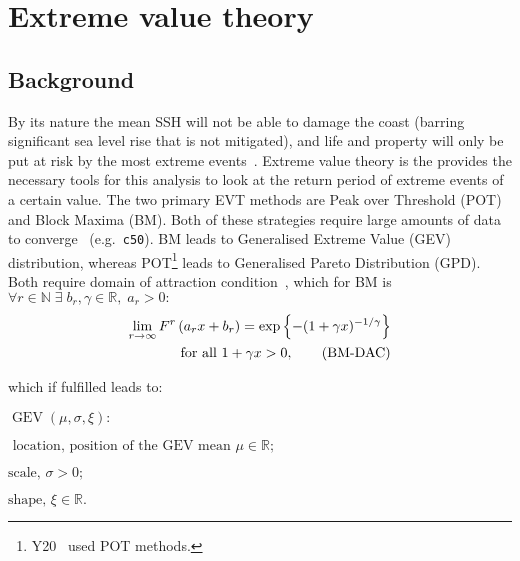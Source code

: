 \section{Extreme value theory}
\label{sec:evt}
\subsection{Background}
By its nature the mean SSH will
not be able to damage the coast
(barring significant sea level rise that is not mitigated),
and life and property will only be put
at risk by the most extreme events~\cite{taleb2019statistical}.
Extreme value theory is the provides the necessary tools for this analysis
to look at the return period of extreme events of a certain value.
The two primary EVT methods are Peak over Threshold (POT) and Block Maxima (BM).
Both of these strategies require
large amounts of data to converge~\cite{taleb2019much} (e.g.~\texttt{c50}).
BM leads to Generalised Extreme Value (GEV) distribution,
whereas POT\footnote{Y20~\cite{ZannaPreprint} used POT methods. }
leads to Generalised Pareto Distribution (GPD).
Both require domain of attraction condition~\cite{bucher2018horse}, which
for BM is
$\forall r \in \mathbb{N} \;\exists \;b_r, \gamma\in \mathbb{R},\; a_r>0: $
    \begin{align}
    \lim _{r \rightarrow \infty} F^{r}\left(a_{r} x+b_{r}\right)=\exp \left\{-(1+\gamma x)^{-1 / \gamma}\right\} \notag \\
     \text { for all } 1+\gamma x>0,
    \tag{BM-DAC}
    \end{align}

which if fulfilled leads to:


    \(
    \operatorname{GEV}(\mu, \sigma, \xi):
    \)

    \(
    \text{ location, position of the GEV mean } \mu \in \mathbb{R};
    \)

    \(
    \text{scale, } \sigma>0;
    \)

    \(
    \text{shape, } \xi \in \mathbb{R}.
    \)

